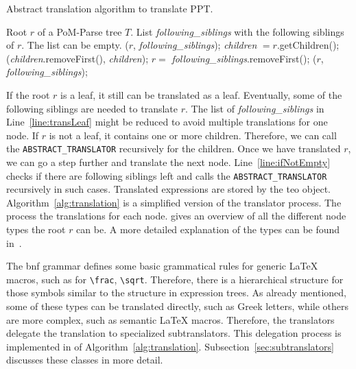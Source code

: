 \documentclass[a4paper,11pt]{article}
\theoremstyle{defTheoStyle}
\theoremstyle{defExampStyle}
\begin{document}
\begin{algorithm}[t]
\caption{Abstract translation algorithm to translate PPT.}\label{alg:translation}
	\begin{algorithmic}[1]
	\Require Root $r$ of a PoM-Parse tree $T$. List \textit{following\_siblings} with the following siblings of $r$. The list can be empty.
		($r$, \textit{following\_siblings});\label{line:transLeaf}
	\Else
		\State \textit{children} $ = r$.getChildren(); 
		(\textit{children}.removeFirst(), \textit{children});\label{line:transSeq}
	\EndIf
	\label{line:ifNotEmpty}
		\State $r =$ \textit{following\_siblings}.removeFirst();
		($r$, \textit{following\_siblings});
	\EndIf
	\EndProcedure
	\end{algorithmic}
\end{algorithm}

If the root $r$ is a leaf, it still can be translated as a leaf. Eventually, some of the following siblings are needed to translate $r$. The list of \textit{following\_siblings} in Line~\ref{line:transLeaf} might be reduced to avoid multiple translations for one node. If $r$ is not a leaf, it contains one or more children. Therefore, we can call the {\footnotesize \verb|ABSTRACT_TRANSLATOR|} recursively for the children. Once we have translated $r$, we can go a step further and translate the next node. Line~\ref{line:ifNotEmpty} checks if there are following siblings left and calls the {\footnotesize \verb|ABSTRACT_TRANSLATOR|} recursively in such cases. Translated expressions are stored by the \gls*{teo} object. Algorithm~\ref{alg:translation} is a simplified version of the translator process. The  process the translations for each node.  gives an overview of all the different node types the root $r$ can be. A more detailed explanation of the types can be found in~\parencite{POM-Tagger}.

The \gls*{bnf} grammar defines some basic grammatical rules for generic \LaTeX{} macros, such as for \verb|\frac|, \verb|\sqrt|. Therefore, there is a hierarchical structure for those symbols similar to the structure in expression trees. As already mentioned, some of these types can be translated directly, such as Greek letters, while others are more complex, such as semantic \LaTeX{} macros. Therefore, the translators delegate the translation to specialized subtranslators. This delegation process is implemented in  of Algorithm~\ref{alg:translation}.  
Subsection~\ref{sec:subtranslators} discusses these classes in more detail.
\end{document}
